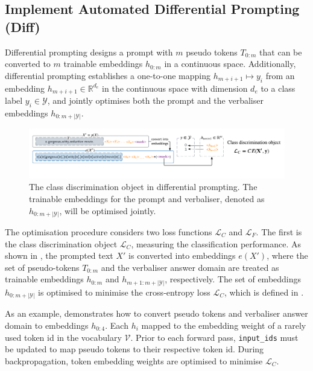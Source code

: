 
\vspace{-1.0em}
\subsection{Implement Automated Differential Prompting (Diff)} \label{sec:diff-prompt}
Differential prompting designs a prompt with $m$ pseudo tokens $T_{0:m}$ that can be converted to $m$ trainable embeddings $h_{0:m}$ in a continuous space. Additionally, differential prompting establishes a one-to-one mapping $h_{m+i+1} \mapsto y_i$ from an embedding $h_{m+i+1} \in \mathbb{R}^{d_e}$ in the continuous space with dimension $d_e$ to a class label $y_i \in \mathcal{Y}$, and jointly optimises both the prompt and the verbaliser embeddings $h_{0:m+|\mathcal{Y}|}$.

\begin{figure}[!ht]
    \centering
    \includegraphics[width=\hsize]{figures/implementation_media/impl-diff-lc.pdf}
    \caption{The class discrimination object in differential prompting. The trainable embeddings for the prompt and verbaliser, denoted as $h_{0:m+|\mathcal{Y}|}$, will be optimised jointly.}
    \label{fig:impl-diff-1}
\end{figure}

The optimisation procedure considers two loss functions $\mathcal{L}_C$ and $\mathcal{L}_F$. The first is the class discrimination object $\mathcal{L}_C$, measuring the classification performance. As shown in , the prompted text $X'$ is converted into embeddings $e(X')$, where the set of pseudo-tokens $T_{0:m}$ and the verbaliser answer domain are treated as trainable embeddings $h_{0:m}$ and $h_{m+1:m+|\mathcal{Y}|}$, respectively. The set of embeddings $h_{0:m+|\mathcal{Y}|}$ is optimised to minimise the cross-entropy loss $\mathcal{L}_C$, which is defined in . 

As an example,  demonstrates how to convert pseudo tokens and verbaliser answer domain to embeddings $h_{0:4}$. Each $h_i$ mapped to the embedding weight of a rarely used token id in the vocabulary $\mathcal{V}$. Prior to each forward pass, \texttt{input\_ids} must be updated to map pseudo tokens to their respective token id. During backpropagation, token embedding weights are optimised to minimise $\mathcal{L}_C$.


